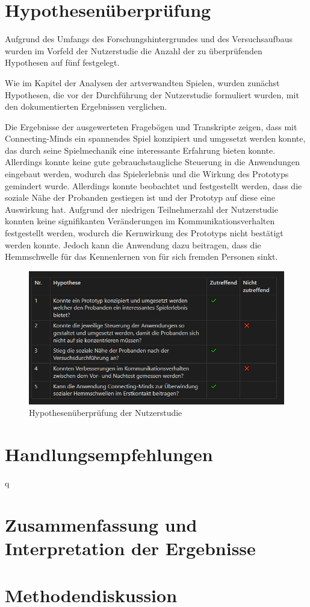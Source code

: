 \section{Hypothesenüberprüfung}
Aufgrund des Umfangs des Forschungshintergrundes und des Versuchsaufbaus wurden im Vorfeld der Nutzerstudie die Anzahl der zu überprüfenden Hypothesen auf fünf festgelegt.

Wie im Kapitel der Analysen der artverwandten Spielen, wurden zunächst Hypothesen, die vor der Durchführung der Nutzerstudie formuliert wurden, mit den dokumentierten Ergebnissen verglichen. 

Die Ergebnisse der ausgewerteten Fragebögen und Transkripte zeigen, dass mit Connecting-Minds ein spannendes Spiel konzipiert und umgesetzt werden konnte, das durch seine Spielmechanik eine interessante Erfahrung bieten konnte. Allerdings konnte keine gute gebrauchstaugliche Steuerung in die Anwendungen eingebaut werden, wodurch das Spielerlebnis und die Wirkung des Prototyps gemindert wurde. Allerdings konnte beobachtet und festgestellt werden, dass die soziale Nähe der Probanden gestiegen ist und der Prototyp auf diese eine Auswirkung hat. Aufgrund der niedrigen Teilnehmerzahl der Nutzerstudie konnten keine signifikanten Veränderungen im Kommunikationsverhalten festgestellt werden, wodurch die Kernwirkung des Prototyps nicht bestätigt werden konnte. Jedoch kann die Anwendung dazu beitragen, dass die Hemmschwelle für das Kennenlernen von für sich fremden Personen sinkt.

\begin{figure}[ht]
\centering
\includegraphics[width=1\linewidth]{content/pictures/Hypothesen_Nutzerstudie.PNG}
\caption{Hypothesenüberprüfung der Nutzerstudie}
\label{fig:hypothesis_user_study}
\end{figure}

\section{Handlungsempfehlungen}
q

\section{Zusammenfassung und Interpretation der Ergebnisse}

\section{Methodendiskussion}